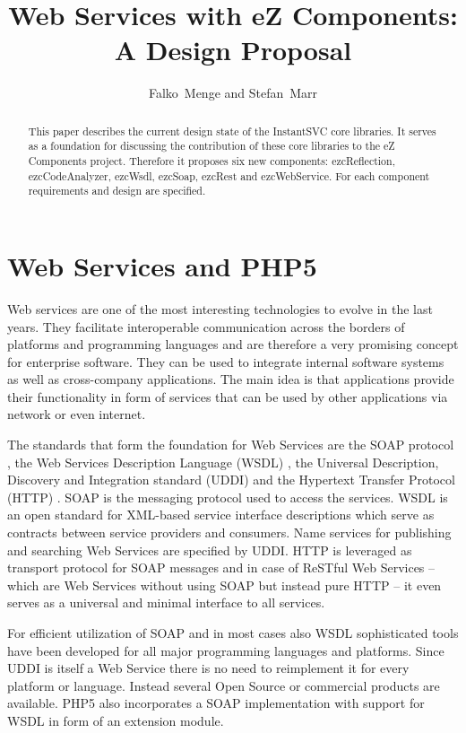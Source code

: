 \documentclass[10pt,final,a4paper,oneside]{article}
\begin{document}
\title{Web Services with eZ Components:\\ A Design Proposal}
\author{Falko~Menge and Stefan~Marr}

\maketitle


\begin{abstract}
This paper describes the current design state
of the InstantSVC core libraries.
It serves as a foundation for discussing the contribution
of these core libraries to the eZ Components project.
Therefore it proposes six new components:
ezcReflection, ezcCodeAnalyzer, ezcWsdl, ezcSoap, ezcRest and ezcWebService.
For each component requirements and design are specified.
\end{abstract}

\section{Web Services and PHP5}\label{sec:Introduction}
Web services are one of the most interesting technologies to evolve in the
last years. They facilitate interoperable communication across the borders of 
platforms and programming languages and are therefore a very 
promising concept for enterprise software. They can be used to integrate 
internal software systems as well as cross-company applications. The main idea is that 
applications provide their functionality in form of services that can be 
used by other applications via network or even internet. 

The standards that form the foundation for Web Services are the SOAP
protocol \cite{SOAP}, the Web Services Description Language (WSDL) \cite{WSDL},
the Universal Description, Discovery and Integration standard (UDDI) \cite{UDDI} and the
Hypertext Transfer Protocol (HTTP) \cite{HTTP}.
SOAP is the messaging protocol used to access the services. WSDL is an
open standard for XML-based service interface descriptions which serve as
contracts between service providers and consumers. Name services for
publishing and searching Web Services are specified by UDDI. HTTP is
leveraged as transport protocol for SOAP messages and in case of ReSTful
Web Services -- which are Web Services without using SOAP but instead pure HTTP --
it even serves as a universal and minimal interface to all
services.

For efficient utilization of SOAP and in most cases also WSDL
sophisticated tools have been developed for all major programming
languages and platforms.
Since UDDI is itself a Web Service there is no need
to reimplement it for every platform or language.
Instead several Open Source or commercial products are available.
PHP5 also incorporates a SOAP implementation with support for WSDL
in form of an extension module.
\end{document}
